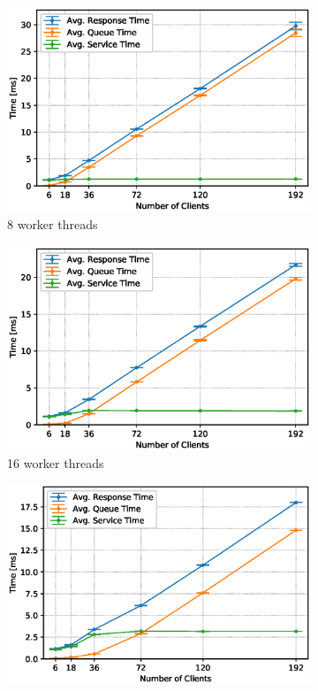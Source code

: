 \documentclass[11pt,a4paper]{article}
\begin{document}
\begin{figure}
    \begin{subfigure}{.5\textwidth}
        \includegraphics[width=1\linewidth]{plots/3_1b_extendedLatencyMiddleware_8w.eps}
        \caption{8 worker threads}
    \end{subfigure}
    \begin{subfigure}{.5\textwidth}
        \includegraphics[width=1\linewidth]{plots/3_1b_extendedLatencyMiddleware_16w.eps}
        \caption{16 worker threads}
    \end{subfigure}
    \begin{subfigure}{.5\textwidth}
        \includegraphics[width=1\linewidth]{plots/3_1b_extendedLatencyMiddleware_32w.eps}

\end{subfigure}
\end{figure}
\end{document}
